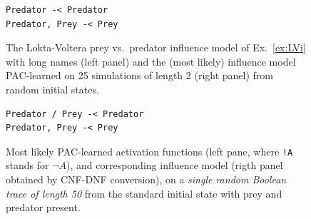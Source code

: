 \documentclass{llncs}
\begin{document}
\begin{figure}[htb]
   \begin{minipage}{.5\textwidth}
	
   \end{minipage}%
   \hspace{.04\textwidth}%
   \begin{minipage}{.45\textwidth}
      \begin{lstlisting}[frame=single]
Predator -< Predator
Predator, Prey -< Prey
      \end{lstlisting}
   \end{minipage}
   \caption{The Lokta-Voltera prey vs.\ predator influence model of Ex.~\ref{ex:LVi}
   with long names (left panel) and the (most likely) influence model PAC-learned on 25 simulations of length 2 (right panel) from random initial states.\label{bool-LV}}
\end{figure}


\begin{figure}[htb]
   \begin{minipage}{.5\textwidth}
      
   \end{minipage}%
   \hspace{.04\textwidth}%
   \begin{minipage}{.45\textwidth}
      \begin{lstlisting}[frame=single]
Predator / Prey -< Predator
Predator, Prey -< Prey
      \end{lstlisting}
   \end{minipage}
   \caption{Most likely PAC-learned activation functions (left pane, where \texttt{!A} stands for $\neg A$), and corresponding influence model (rigth panel obtained by CNF-DNF conversion), on a \emph{single random Boolean trace of length 50} from the standard initial state with prey and predator present.}\label{bool-LV.res}
\end{figure}
\end{document}
